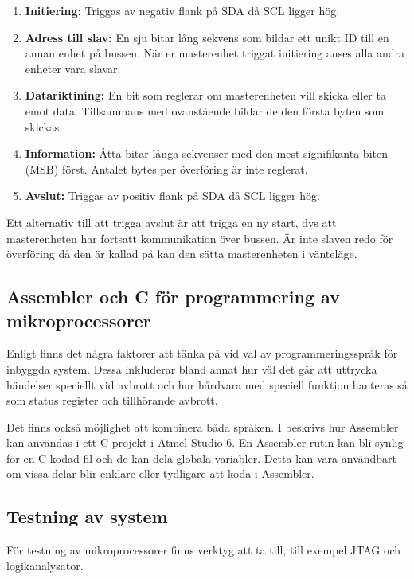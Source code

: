 \documentclass[11pt]{article}
\begin{document}
\begin{flushleft}
\begin{enumerate}
	\item \textbf{Initiering:} Triggas av negativ flank på SDA då SCL ligger hög.
	\item \textbf{Adress till slav:} En sju bitar lång sekvens som bildar ett unikt ID till en annan enhet på bussen. När er masterenhet triggat initiering anses alla andra enheter vara slavar.
	\item \textbf{Datariktining:} En bit som reglerar om masterenheten vill skicka eller ta emot data. Tillsammans med ovanstående bildar de den första byten som skickas.
	\item \textbf{Information:} Åtta bitar långa sekvenser med den mest signifikanta biten (MSB) först. Antalet bytes per överföring är inte reglerat.
	\item \textbf{Avslut:} Triggas av positiv flank på SDA då SCL ligger hög.
\end{enumerate}

Ett alternativ till att trigga avslut är att trigga en ny start, dvs att masterenheten har fortsatt kommunikation över bussen. Är inte slaven redo för överföring då den är kallad på kan den sätta masterenheten i vänteläge. \cite{guideI2CPhilips}



\subsection{Assembler och C för programmering av mikroprocessorer}

Enligt \cite{CPC} finns det några faktorer att tänka på vid val av programmeringsspråk för inbyggda system. Dessa inkluderar bland annat hur väl det går att uttrycka händelser speciellt vid avbrott och hur hårdvara med speciell funktion hanteras så som status register och tillhörande avbrott.  

Det finns också möjlighet att kombinera båda språken. I \cite{AssC} beskrivs hur Assembler kan användas i ett C-projekt i Atmel Studio 6. En Assembler rutin kan bli synlig för en C kodad fil och de kan dela globala variabler. Detta kan vara användbart om vissa delar blir enklare eller tydligare att koda i Assembler.

\subsection{Testning av system} 

För testning av mikroprocessorer finns verktyg att ta till, till exempel JTAG och logikanalysator.


\end{flushleft}
\end{document}
